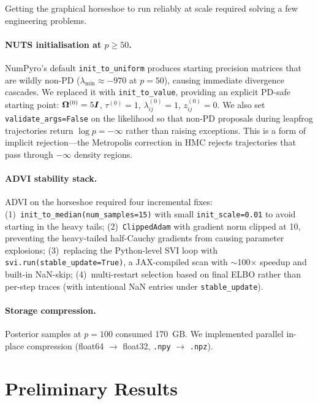 \documentclass[10pt,conference,compsoc]{IEEEtran}
\begin{document}
Getting the graphical horseshoe to run reliably at scale required solving a few engineering problems.

\paragraph{NUTS initialisation at $p \geq 50$.}
NumPyro's default \texttt{init\_to\_uniform} produces starting precision matrices that are wildly non-PD ($\lambda_{\min} \approx -970$ at $p{=}50$), causing immediate divergence cascades. We replaced it with \texttt{init\_to\_value}, providing an explicit PD-safe starting point: $\bm{\Omega}^{(0)} = 5\bm{I}$, $\tau^{(0)} = 1$, $\lambda_{ij}^{(0)} = 1$, $z_{ij}^{(0)} = 0$. We also set \texttt{validate\_args=False} on the likelihood so that non-PD proposals during leapfrog trajectories return $\log p = -\infty$ rather than raising exceptions. This is a form of implicit rejection---the Metropolis correction in HMC rejects trajectories that pass through $-\infty$ density regions.

\paragraph{ADVI stability stack.}
ADVI on the horseshoe required four incremental fixes: (1)~\texttt{init\_to\_median(num\_samples=15)} with small \texttt{init\_scale=0.01} to avoid starting in the heavy tails; (2)~\texttt{ClippedAdam} with gradient norm clipped at 10, preventing the heavy-tailed half-Cauchy gradients from causing parameter explosions; (3)~replacing the Python-level SVI loop with \texttt{svi.run(stable\_update=True)}, a JAX-compiled scan with $\sim$100$\times$ speedup and built-in NaN-skip; (4)~multi-restart selection based on final ELBO rather than per-step traces (with intentional NaN entries under \texttt{stable\_update}).

\paragraph{Storage compression.}
Posterior samples at $p=100$ consumed 170~GB. We implemented parallel in-place compression (float64 $\to$ float32, \texttt{.npy} $\to$ \texttt{.npz}).

\section{Preliminary Results}
\end{document}

